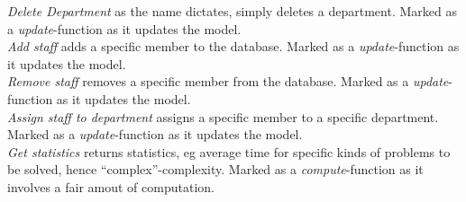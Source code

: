 \emph{Delete Department} as the name dictates, simply deletes a department. Marked as a \textit{update}-function as it updates the model. \\
\emph{Add staff} adds a specific \astaff[] member to the database. Marked as a \textit{update}-function as it updates the model. \\
\emph{Remove staff} removes a specific \astaff[] member from the database. Marked as a \textit{update}-function as it updates the model. \\
\emph{Assign staff to department} assigns a specific \astaff[] member to a specific department. Marked as a \textit{update}-function as it updates the model. \\
\emph{Get statistics} returns statistics, eg average time for specific kinds of problems to be solved, hence ``complex''-complexity. Marked as a \textit{compute}-function as it involves a fair amout of computation.
